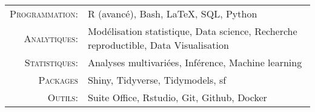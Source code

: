 \documentclass[localFont,alternative]{yaac-another-awesome-cv}
\begin{document}
\makecvheader

\renewcommand{\arraystretch}{1.1}

	\begin{tabular}{>{}r>{}p{13cm}}  
		\textsc{Programmation:}               	&   R (avancé), Bash, LaTeX, SQL, Python \\
		\textsc{Analytiques:}              &    Modélisation statistique, Data science, Recherche reproductible, Data Visualisation\\ 
		\textsc{Statistiques:}  	 &   Analyses multivariées, Inférence, Machine learning \\
		\textsc{Packages}              &    Shiny, Tidyverse, Tidymodels, sf \\
		\textsc{Outils:}               	&  Suite Office, Rstudio, Git, Github, Docker 
	\end{tabular}
	
\end{document}
